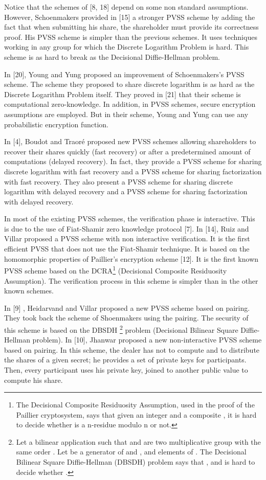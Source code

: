 \documentclass[submission,copyright,creativecommons]{eptcs}
\begin{document}
Notice that the schemes of [8, 18] depend on some non standard assumptions.
However, Schoenmakers provided in [15] a stronger PVSS scheme by adding the
fact that when submitting his share, the shareholder must provide its
correctness proof. His PVSS scheme is simpler than the previous schemes. It
uses techniques working in any group for which the Discrete Logarithm
Problem is hard. This scheme is as hard to break as the Decisional
Diffie-Hellman problem.

In [20], Young and Yung proposed an improvement of Schoenmakers's PVSS scheme.
The scheme they proposed to share discrete logarithm is as hard as the
Discrete Logarithm Problem itself. They proved in [21] that their scheme is
computational zero-knowledge. In addition, in PVSS schemes, secure
encryption assumptions are employed. But in their scheme, Young and Yung can
use any probabilistic encryption function.

In [4], Boudot and Traor\'{e} proposed new PVSS schemes allowing shareholders
to recover their shares quickly (fast recovery) or after a predetermined
amount of computations (delayed recovery). In fact, they provide a PVSS
scheme for sharing discrete logarithm with fast recovery and a PVSS scheme
for sharing factorization with fast recovery. They also present a PVSS
scheme for sharing discrete logarithm with delayed recovery and a PVSS
scheme for sharing factorization with delayed recovery.

In most of the existing PVSS schemes, the verification phase is interactive.
This is due to the use of Fiat-Shamir zero knowledge protocol [7]. In [14],
Ruiz and Villar proposed a PVSS scheme with non interactive verification. It
is the first efficient PVSS that does not use the Fiat-Shamir technique. It
is based on the homomorphic properties of Paillier's encryption scheme [12].
It is the first known PVSS scheme based on the DCRA\footnote{The Decisional Composite Residuosity Assumption, used in the proof of the
Paillier cryptosystem, says that given an integer  and a composite ,
it is hard to decide whether  is a n-residue modulo n or not.}
(Decisional Composite Residuosity Assumption). The verification process in
this scheme is simpler than in the other known schemes.

In [9] , Heidarvand and Villar proposed a new PVSS scheme based on pairing.
They took back the scheme of Shoenmakers using the pairing. The security of
this scheme is based on the DBSDH \footnote{Let    a bilinear application such
that  and  are two multiplicative group with the same order . Let  be a generator of  and ,  and  elements of . The Decisional Bilinear Square Diffie-Hellman (DBSDH)
problem says that ,  and  is hard to decide
whether .} problem (Decisional Bilinear Square
Diffie-Hellman problem). In [10], Jhanwar proposed a new non-interactive
PVSS scheme based on pairing. In this scheme, the dealer has not to compute
and to distribute the shares of a given secret; he provides a set of private
keys for participants. Then, every participant uses his private key, joined
to another public value to compute his share.
\end{document}

